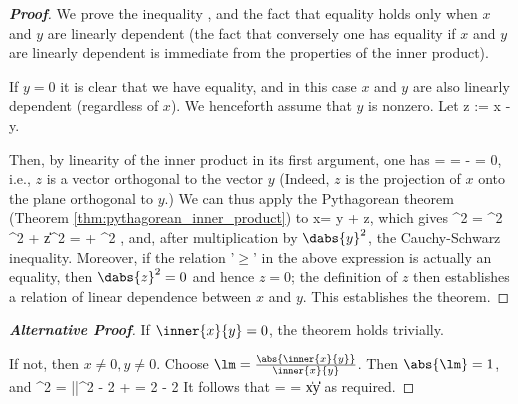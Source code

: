 \begin{proof}[\bf Proof]%
We prove the inequality \be {} \leq {}, \ee and the fact that equality holds only when $x$ and $y$ are linearly dependent (the fact that conversely one has equality if
$x$ and $y$ are linearly dependent is immediate from the properties of the inner product).

If $y = 0$ it is clear that we have equality, and in this case $x$ and $y$ are also linearly dependent (regardless of $x$). We henceforth assume that $y$ is nonzero. Let
\be
z := x -  {} y.
\ee

Then, by linearity of the inner product in its first argument, one has
\be
{} =  =  -  {}  = 0,
\ee
i.e., $z$ is a vector orthogonal to the vector $y$ (Indeed, $z$ is the projection of $x$ onto the plane orthogonal to $y$.) We can thus apply the Pythagorean theorem (Theorem
\ref{thm:pythagorean_inner_product}) to
\be
x=  {} y + z,
\ee
which gives
\be
{}^2 = ^2 ^2 + \left\|z\right\|^2 =  + ^2 \geq {},
\ee
and, after multiplication by $\dabs{y}^2$, the Cauchy-Schwarz inequality. Moreover, if the relation '$\geq$' in the above expression is actually an equality, then $\dabs{z}^2 = 0$ and hence $z = 0$; the definition of
$z$ then establishes a relation of linear dependence between $x$ and $y$. This establishes the theorem.
\end{proof}

\begin{proof}[\bf Alternative Proof] %
If $\inner{x}{y} = 0$, the theorem holds trivially.

If not, then $x \neq 0, y \neq 0$. Choose $\lm = \frac{\abs{\inner{x}{y}}}{\inner{x}{y}}$. Then $\abs{\lm} = 1$, and
 \le {}^2 = |\lm|^2  - 2 \Re{} +  = 2 - 2 
\ee
It follows that
\be
{} = \Re{} = \Re{} \le \|x\|\|y\|
\ee
as required.
\end{proof}

